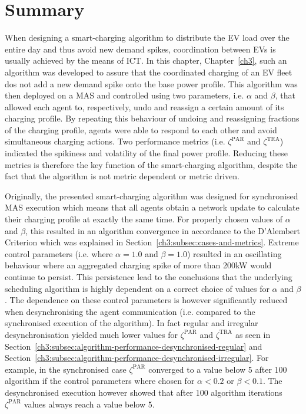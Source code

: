 \pagebreak

\section{Summary}
\label{ch3:sec:summary}

When designing a smart-charging algorithm to distribute the EV load over the entire day and thus avoid new demand spikes, coordination between EVs is usually achieved by the means of ICT.
In this chapter, Chapter~\ref{ch3}, such an algorithm was developed to assure that the coordinated charging of an EV fleet dos not add a new demand spike onto the base power profile.
This algorithm was then deployed on a MAS and controlled using two parameters, i.e. $\alpha$ and $\beta$, that allowed each agent to, respectively, undo and reassign a certain amount of its charging profile.
By repeating this behaviour of undoing and reassigning fractions of the charging profile, agents were able to respond to each other and avoid simultaneous charging actions.
Two performance metrics (i.e. $\zeta^\text{PAR}$ and $\zeta^\text{TRA}$) indicated the spikiness and volatility of the final power profile.
Reducing these metrics is therefore the key function of the smart-charging algorithm, despite the fact that the algorithm is not metric dependent or metric driven.

Originally, the presented smart-charging algorithm was designed for synchronised MAS execution which means that all agents obtain a network update to calculate their charging profile at exactly the same time.
For properly chosen values of $\alpha$ and $\beta$, this resulted in an algorithm convergence in accordance to the D'Alembert Criterion which was explained in Section~\ref{ch3:subsec:cases-and-metrics}.
Extreme control parameters (i.e. where $\alpha=1.0$ and $\beta=1.0$) resulted in an oscillating behaviour where an aggregated charging spike of more than 200kW would continue to persist.
This persistence lead to the conclusions that the underlying scheduling algorithm is highly dependent on a correct choice of values for $\alpha$ and $\beta$.
The dependence on these control parameters is however significantly reduced when desynchronising the agent communication (i.e. compared to the synchronised execution of the algorithm).
In fact regular and irregular desynchronisation yielded much lower values for $\zeta^\text{PAR}$ and $\zeta^\text{TRA}$ as seen in Section~\ref{ch3:subsec:algorithm-performance-desynchronised-regular} and Section~\ref{ch3:subsec:algorithm-performance-desynchronised-irregular}.
For example, in the synchronised case $\zeta^\text{PAR}$ converged to a value below 5 after 100 algorithm if the control parameters where chosen for $\alpha < 0.2$ or $\beta < 0.1$.
The desynchronised execution however showed that after 100 algorithm iterations $\zeta^\text{PAR}$ values always reach a value below 5.

